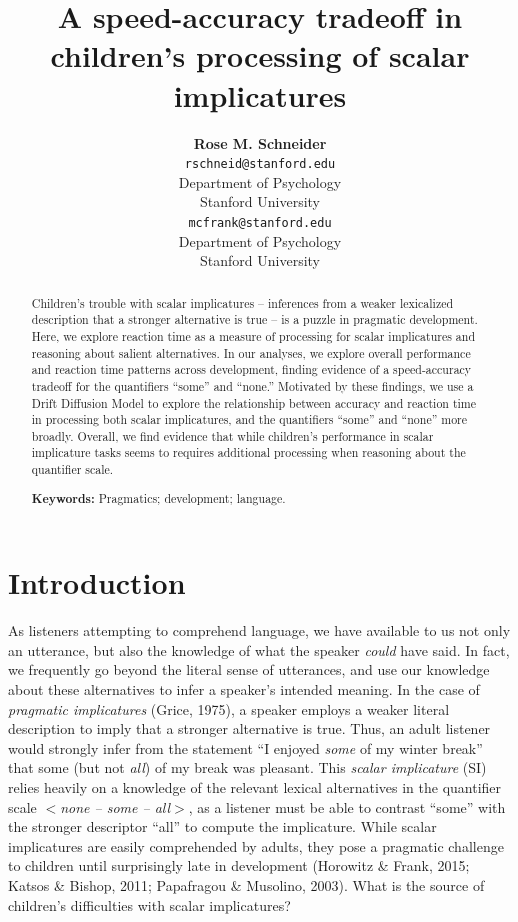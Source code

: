 \documentclass[10pt, letterpaper]{article}
\title{A speed-accuracy tradeoff in children's processing of scalar
implicatures}
\author{{\large \bf Rose M. Schneider} \\ \texttt{rschneid@stanford.edu} \\ Department of Psychology \\ Stanford University \And {\large \bf Michael C. Frank} \\ \texttt{mcfrank@stanford.edu} \\ Department of Psychology \\ Stanford University}
\begin{document}
\maketitle

\begin{abstract}
Children's trouble with scalar implicatures -- inferences from a weaker
lexicalized description that a stronger alternative is true -- is a
puzzle in pragmatic development. Here, we explore reaction time as a
measure of processing for scalar implicatures and reasoning about
salient alternatives. In our analyses, we explore overall performance
and reaction time patterns across development, finding evidence of a
speed-accuracy tradeoff for the quantifiers ``some'' and ``none.''
Motivated by these findings, we use a Drift Diffusion Model to explore
the relationship between accuracy and reaction time in processing both
scalar implicatures, and the quantifiers ``some'' and ``none'' more
broadly. Overall, we find evidence that while children's performance in
scalar implicature tasks seems to requires additional processing when
reasoning about the quantifier scale.

\textbf{Keywords:}
Pragmatics; development; language.
\end{abstract}

\section{Introduction}\label{introduction}

As listeners attempting to comprehend language, we have available to us
not only an utterance, but also the knowledge of what the speaker
\emph{could} have said. In fact, we frequently go beyond the literal
sense of utterances, and use our knowledge about these alternatives to
infer a speaker's intended meaning. In the case of \emph{pragmatic
implicatures} (Grice, 1975), a speaker employs a weaker literal
description to imply that a stronger alternative is true. Thus, an adult
listener would strongly infer from the statement ``I enjoyed \emph{some}
of my winter break'' that some (but not \emph{all}) of my break was
pleasant. This \emph{scalar implicature} (SI) relies heavily on a
knowledge of the relevant lexical alternatives in the quantifier scale
\(<\)\emph{none -- some -- all}\(>\), as a listener must be able to
contrast ``some'' with the stronger descriptor ``all'' to compute the
implicature. While scalar implicatures are easily comprehended by
adults, they pose a pragmatic challenge to children until surprisingly
late in development (Horowitz \& Frank, 2015; Katsos \& Bishop, 2011;
Papafragou \& Musolino, 2003). What is the source of children's
difficulties with scalar implicatures?
\end{document}
